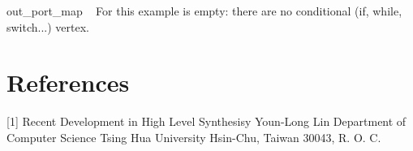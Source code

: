 \begin{DoxyItemize}
\item out\+\_\+port\+\_\+map ~\newline
For this example is empty\+: there are no conditional (if, while, switch...) vertex.~\newline
 
\end{DoxyItemize}\hypertarget{src_HLS_page_References}{}\section{References}\label{src_HLS_page_References}
\mbox{[}1\mbox{]} Recent Development in High Level Synthesisy Youn-\/\+Long Lin Department of Computer Science Tsing Hua University Hsin-\/\+Chu, Taiwan 30043, R. O. C. 